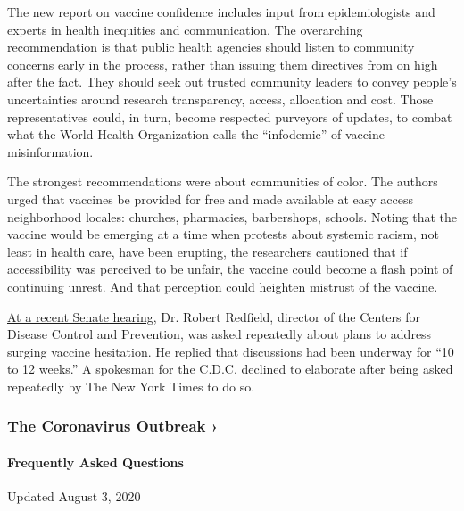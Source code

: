 The new report on vaccine confidence includes input from epidemiologists
and experts in health inequities and communication. The overarching
recommendation is that public health agencies should listen to community
concerns early in the process, rather than issuing them directives from
on high after the fact. They should seek out trusted community leaders
to convey people's uncertainties around research transparency, access,
allocation and cost. Those representatives could, in turn, become
respected purveyors of updates, to combat what the World Health
Organization calls the ``infodemic'' of vaccine misinformation.

The strongest recommendations were about communities of color. The
authors urged that vaccines be provided for free and made available at
easy access neighborhood locales: churches, pharmacies, barbershops,
schools. Noting that the vaccine would be emerging at a time when
protests about systemic racism, not least in health care, have been
erupting, the researchers cautioned that if accessibility was perceived
to be unfair, the vaccine could become a flash point of continuing
unrest. And that perception could heighten mistrust of the vaccine.

\href{https://www.nytimes.com/2020/06/30/us/politics/fauci-coronavirus.html}{At
a recent Senate hearing}, Dr. Robert Redfield, director of the Centers
for Disease Control and Prevention, was asked repeatedly about plans to
address surging vaccine hesitation. He replied that discussions had been
underway for ``10 to 12 weeks.'' A spokesman for the C.D.C. declined to
elaborate after being asked repeatedly by The New York Times to do so.

\href{https://www.nytimes.com/news-event/coronavirus?action=click\&pgtype=Article\&state=default\&region=MAIN_CONTENT_3\&context=storylines_faq}{}

\hypertarget{the-coronavirus-outbreak-}{%
\subsubsection{The Coronavirus Outbreak
›}\label{the-coronavirus-outbreak-}}

\hypertarget{frequently-asked-questions}{%
\paragraph{Frequently Asked
Questions}\label{frequently-asked-questions}}

Updated August 3, 2020


